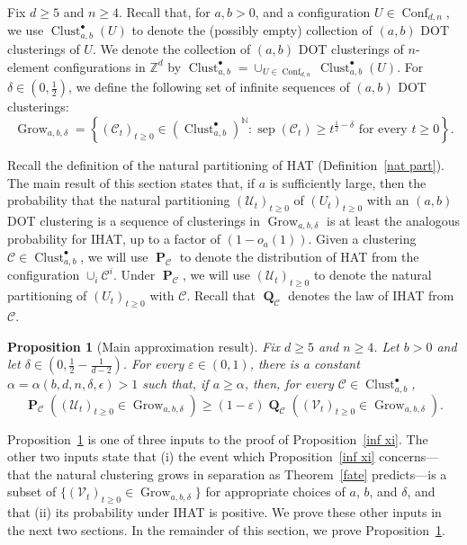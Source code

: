 \documentclass[11pt,reqno]{amsart}
\newtheorem{proposition}[lemma]{Proposition}
\theoremstyle{definition}
\numberwithin{equation}{section}
\newcommand{\N}{\mathbb{N}}
\newcommand{\Z}{\mathbb{Z}}
\newcommand{\1}{\mathbf{1}}
\newcommand{\eps}{\epsilon}
\DeclareMathOperator{\PP}{\mathbf{P}}
\DeclareMathOperator{\QQ}{\mathbf{Q}}
\DeclareMathOperator{\sep}{sep}
\newcommand{\CC}{\mathcal{C}}
\newcommand{\UU}{\mathcal{U}}
\newcommand{\VV}{\mathcal{V}}
\DeclareMathOperator{\Conf}{\mathrm{Conf}}
\DeclareMathOperator{\Clust}{\mathrm{Clust}}
\DeclareMathOperator{\Grow}{\mathrm{Grow}}
\begin{document}
Fix $d \geq 5$ and $n \geq 4$. Recall that, for $a, b> 0$, and a configuration $U \in \Conf_{d,n}$, we use $\Clust_{a,b}^\bullet (U)$ to denote the (possibly empty) collection of $(a,b)$ DOT clusterings of $U$. We denote the collection of $(a,b)$ DOT clusterings of $n$-element configurations in $\Z^d$ by $\Clust_{a,b}^\bullet = \cup_{U \in \Conf_{d,n}} \Clust_{a,b}^\bullet (U)$. For $\delta \in (0,\frac12)$, we define the following set of infinite sequences of $(a,b)$ DOT clusterings:
\begin{equation}\label{event grow}
\Grow_{a,b,\delta} = \left\{ (\CC_t)_{t \geq 0} \in (\Clust_{a,b}^\bullet)^\N: \sep (\CC_t) \geq t^{\frac12-\delta} \,\,\text{for every $t \geq 0$} \right\}.
\end{equation}



Recall the definition of the natural partitioning of HAT (Definition~\ref{nat part}). The main result of this section states that, if $a$ is sufficiently large, then the probability that the natural partitioning $(\UU_t)_{t \geq 0}$ of $(U_t)_{t \geq 0}$ with an $(a,b)$ DOT clustering is a sequence of clusterings in $\Grow_{a,b,\delta}$ is at least the analogous probability for IHAT, up to a factor of $(1- o_a (1))$. Given a clustering $\CC \in \Clust_{a,b}^\bullet$, we will use $\PP_\CC$ to denote the distribution of HAT from the configuration $\cup_i \CC^i$. Under $\PP_\CC$, we will use $(\UU_t)_{t \geq 0}$ to denote the natural partitioning of $(U_t)_{t \geq 0}$ with $\CC$. Recall that $\QQ_\CC$ denotes the law of IHAT from $\CC$.

\begin{proposition}[Main approximation result]\label{pe to qe}
Fix $d \geq 5$ and $n \geq 4$. Let $b > 0$ and let $\delta \in (0, \frac12 - \frac{1}{d-2})$. For every $\varepsilon \in (0,1)$, there is a constant $\alpha = \alpha (b,d,n,\delta,\eps) > 1$ such that, if $a \geq \alpha$, then, for every $\CC \in \Clust_{a,b}^\bullet$, 
\[
\PP_{\CC} \left( (\UU_t)_{t \geq 0} \in \Grow_{a,b,\delta} \right) \geq (1 - \varepsilon) \QQ_{\CC} \left( (\VV_t)_{t \geq 0} \in \Grow_{a,b,\delta} \right).
\]
\end{proposition}

Proposition~\ref{pe to qe} is one of three inputs to the proof of Proposition~\ref{inf xi}. The other two inputs state that (i) the event which Proposition~\ref{inf xi} concerns---that the natural clustering grows in separation as Theorem~\ref{fate} predicts---is a subset of $\{(\VV_t)_{t \geq 0} \in \Grow_{a,b,\delta}\}$ for appropriate choices of $a$, $b$, and $\delta$, and that (ii) its probability under IHAT is positive. We prove these other inputs in the next two sections. In the remainder of this section, we prove Proposition~\ref{pe to qe}.
\end{document}

